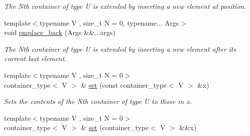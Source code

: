 \begin{DoxyCompactItemize}
\begin{DoxyCompactList}\small\item\em The Nth container of type U is extended by inserting a new element at position. \end{DoxyCompactList}\item 
\hypertarget{classheterogeneous_1_1heterovector_3_01_t_00_01_u_00_01_types_8_8_8_4_ae4f4d87fa05e14c291843fd7d4438e12}{}{\footnotesize template$<$typename V , size\+\_\+t N = 0, typename... Args$>$ }\\void \hyperlink{classheterogeneous_1_1heterovector_3_01_t_00_01_u_00_01_types_8_8_8_4_ae4f4d87fa05e14c291843fd7d4438e12}{emplace\+\_\+back} (Args \&\&...args)\label{classheterogeneous_1_1heterovector_3_01_t_00_01_u_00_01_types_8_8_8_4_ae4f4d87fa05e14c291843fd7d4438e12}

\begin{DoxyCompactList}\small\item\em The Nth container of type U is extended by inserting a new element after its current last element. \end{DoxyCompactList}\item 
\hypertarget{classheterogeneous_1_1heterovector_3_01_t_00_01_u_00_01_types_8_8_8_4_a29abf1f6dd10caa34383e210ca14bc9a}{}{\footnotesize template$<$typename V , size\+\_\+t N = 0$>$ }\\container\+\_\+type$<$ V $>$ \& \hyperlink{classheterogeneous_1_1heterovector_3_01_t_00_01_u_00_01_types_8_8_8_4_a29abf1f6dd10caa34383e210ca14bc9a}{set} (const container\+\_\+type$<$ V $>$ \&x)\label{classheterogeneous_1_1heterovector_3_01_t_00_01_u_00_01_types_8_8_8_4_a29abf1f6dd10caa34383e210ca14bc9a}

\begin{DoxyCompactList}\small\item\em Sets the contents of the Nth container of type U to those in x. \end{DoxyCompactList}\item 
\hypertarget{classheterogeneous_1_1heterovector_3_01_t_00_01_u_00_01_types_8_8_8_4_a2d7c2c07a3e5a468d43bc3654eaabe4e}{}{\footnotesize template$<$typename V , size\+\_\+t N = 0$>$ }\\container\+\_\+type$<$ V $>$ \& \hyperlink{classheterogeneous_1_1heterovector_3_01_t_00_01_u_00_01_types_8_8_8_4_a2d7c2c07a3e5a468d43bc3654eaabe4e}{set} (container\+\_\+type$<$ V $>$ \&\&x)\label{classheterogeneous_1_1heterovector_3_01_t_00_01_u_00_01_types_8_8_8_4_a2d7c2c07a3e5a468d43bc3654eaabe4e}


\end{DoxyCompactItemize}
